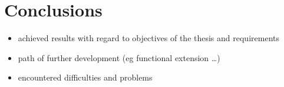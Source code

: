 \documentclass[a4paper,twoside,12pt]{book}
\begin{document}
\chapter{Conclusions}
\begin{itemize}
\item achieved results with regard to objectives of the thesis and requirements
\item path of further development (eg functional extension …)
\item encountered difficulties and problems
\end{itemize}



\backmatter

\printbibliography           %
\end{document}
